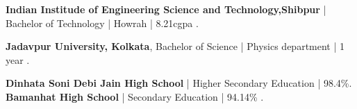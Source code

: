 %
%
%


\begin{scholarship}
					{\textbf{Indian Institude of Engineering Science and Technology,Shibpur} | Bachelor of Technology | Howrah | 8.21cgpa .}
				
					{\textbf{Jadavpur University, Kolkata}, Bachelor of Science | Physics department | 1 year .}
					
					{\textbf{Dinhata Soni Debi Jain High School} | Higher Secondary Education | 98.4\%.}
					{\textbf{Bamanhat High School} | Secondary Education | 94.14\% .}
	
\end{scholarship}